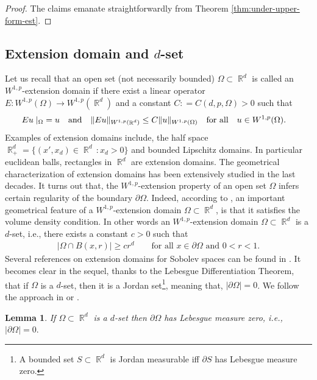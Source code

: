\documentclass[12pt, reqno]{amsart}%
\theoremstyle{plain}  %
\newtheorem{lemma}[theorem]{Lemma}
\theoremstyle{definition}  %
\numberwithin{equation}{section}
\DeclareMathOperator{\R}{\mathbb{R}}
\begin{document}
\begin{proof}
The claims emanate straightforwardly from  Theorem \ref{thm:under-upper-form-est}.
\end{proof}


\subsection{Extension domain and $d$-set}
Let us recall that an open set (not necessarily bounded) $\Omega \subset \R^d$ is called an $W^{1,p}$-extension domain if there exist a linear operator $E:W^{1,p}(\Omega)\to W^{1,p}(\R^d)$ and a constant $C: = C(d,p,\Omega)>0$ such that
\begin{align}\label{eq:w1p-extension}
Eu\mid_{\Omega} &= u \quad\hbox{and} \quad \|Eu\|_{W^{1,p}(\R^d)}\leq C \|u\|_{W^{1,p}(\Omega)} \quad\text{for all}\quad u \in W^{1,p}(\Omega).
\end{align}
\noindent Examples of extension domains include, the half space $\R^d_+= \{(x',x_d)\in \R^d\,: x_d>0 \}$ and  bounded Lipschitz domains. In particular euclidean balls, rectangles in $\R^d$ are extension domains. The geometrical characterization of extension domains has been extensively studied in the last decades.  It turns out that, the $W^{1,p}$-extension property of an open set $\Omega$ infers certain regularity of the boundary $\partial\Omega$. Indeed, according to \cite[Theorem 2]{HKT08}, an important geometrical feature of a  $W^{1,p}$-extension domain $\Omega\subset \R^d$, is that it satisfies  the volume density condition. In other words an  $W^{1,p}$-extension domain $\Omega\subset \R^d$ is  a $d$-set,  i.e.,  there exists a constant $c>0$ such that
\begin{align*}
|\Omega \cap B(x, r)| \geq c r^d  \qquad\text{for all $x \in \partial \Omega$ and $0 < r < 1$.}
\end{align*}
Several references on extension domains for Sobolev spaces can be found in \cite{Zho15}.
It becomes clear in the sequel, thanks to the Lebesgue Differentiation Theorem, that if $\Omega$ is a $d$-set, then it is a Jordan set\footnote{A bounded set $S \subset \R^d$ is Jordan measurable \cite{Zor16} iff $\partial S$ has Lebesgue measure zero.}, meaning that, $|\partial \Omega| = 0$. We follow the approach in \cite{Zho15} or \cite[Lemma 9]{HKT08bis}.

\begin{lemma}\label{lem:d-set-null-set}
If  $\Omega\subset \R^d$ is a $d$-set then $\partial \Omega$ has Lebesgue measure zero,  i.e., 	$|\partial \Omega| = 0.$
\end{lemma}
\end{document}

